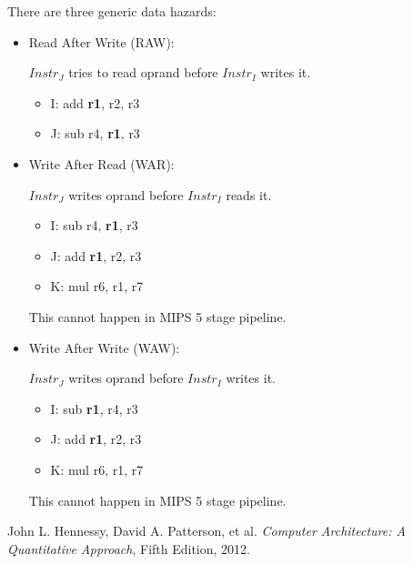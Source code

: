 \documentclass[12pt, a4paper]{article}
\theoremstyle{margin}
\begin{document}
      There are three generic data hazards:
      \begin{itemize}
        \item Read After Write (RAW):

        $Instr_J$ tries to read oprand before $Instr_I$ writes it.
        \begin{itemize}
          \item I: add \textbf{r1}, r2, r3
          \item J: sub r4, \textbf{r1}, r3
        \end{itemize}

        \item Write After Read (WAR):

        $Instr_J$ writes oprand before $Instr_I$ reads it.
        \begin{itemize}
          \item I: sub r4, \textbf{r1}, r3
          \item J: add \textbf{r1}, r2, r3
          \item K: mul r6, r1, r7
        \end{itemize}
        This cannot happen in MIPS 5 stage pipeline.

        \item Write After Write (WAW):

        $Instr_J$ writes oprand before $Instr_I$ writes it.
        \begin{itemize}
          \item I: sub \textbf{r1}, r4, r3
          \item J: add \textbf{r1}, r2, r3
          \item K: mul r6, r1, r7
        \end{itemize}
        This cannot happen in MIPS 5 stage pipeline.


      \end{itemize}
      
\begin{thebibliography}{9}
    John L. Hennessy, David A. Patterson, et al.
    \emph{Computer Architecture: A Quantitative Approach},
    Fifth Edition, 2012.
\end{thebibliography}
\end{document}
